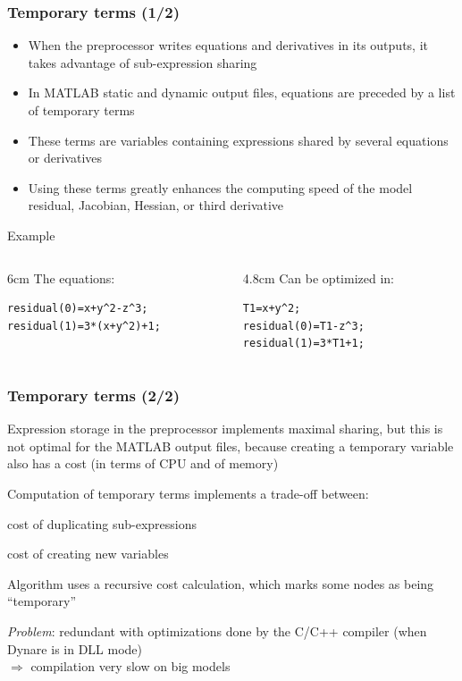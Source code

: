 \documentclass[aspectratio=169]{beamer}
\newenvironment{witemize}{\itemize\addtolength{\itemsep}{8pt}}{\enditemize}
\begin{document}
\begin{frame}[fragile]
  \frametitle{Temporary terms (1/2)}
  \begin{itemize}
  \item When the preprocessor writes equations and derivatives in its outputs, it takes advantage of sub-expression sharing
  \item In MATLAB static and dynamic output files, equations are preceded by a list of \alert{temporary terms}
  \item These terms are variables containing expressions shared by several equations or derivatives
  \item Using these terms greatly enhances the computing speed of the model residual, Jacobian, Hessian, or third derivative
  \end{itemize}
  \begin{block}{Example}
    \begin{columns}[t]
      \begin{column}{6cm}
        The equations:
\begin{verbatim}
residual(0)=x+y^2-z^3;
residual(1)=3*(x+y^2)+1;
\end{verbatim}
      \end{column}
      \begin{column}{4.8cm}
        Can be optimized in:
\begin{verbatim}
T1=x+y^2;
residual(0)=T1-z^3;
residual(1)=3*T1+1;
\end{verbatim}
      \end{column}
    \end{columns}
  \end{block}
\end{frame}

\begin{frame}
  \frametitle{Temporary terms (2/2)}
  \begin{witemize}
  \item Expression storage in the preprocessor implements maximal sharing, but this is not optimal for the MATLAB output files, because creating a temporary variable also has a cost (in terms of CPU and of memory)
  \item Computation of temporary terms implements a trade-off between:
    \begin{witemize}
    \item cost of duplicating sub-expressions
    \item cost of creating new variables
    \end{witemize}
  \item Algorithm uses a recursive cost calculation, which marks some nodes as being ``temporary''
  \item \textit{Problem}: redundant with optimizations done by the C/C++ compiler (when Dynare is in DLL mode)\\
   $\Rightarrow$ compilation very slow on big models
  \end{witemize}
\end{frame}
\end{document}
